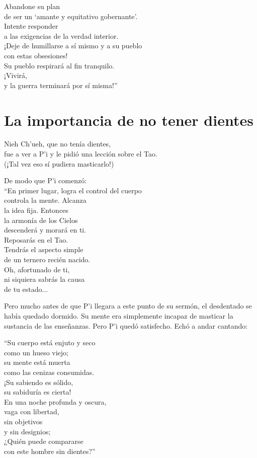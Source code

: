 \documentclass[hidelinks]{memoir}
\begin{document}
	Abandone su plan\\
	de ser un `amante y equitativo gobernante'.\\
	Intente responder\\
	a las exigencias de la verdad interior.\\
	¡Deje de humillarse a sí mismo y a su pueblo\\
	con estas obsesiones!\\
	Su pueblo respirará al fin tranquilo.\\
	¡Vivirá,\\
	y la guerra terminará por sí misma!''
	
	\chapter*{La importancia de no tener dientes}
	
	Nieh Ch'ueh, que no tenía dientes,\\
	fue a ver a P'i y le pidió una lección sobre el Tao.\\
	(¡Tal vez eso sí pudiera masticarlo!)
	
	De modo que P'i comenzó:\\
	``En primer lugar, logra el control del cuerpo\\
	controla la mente. Alcanza\\
	la idea fija. Entonces\\
	la armonía de los Cielos\\
	descenderá y morará en ti.\\
	Reposarás en el Tao.\\
	Tendrás el aspecto simple\\
	de un ternero recién nacido.\\
	Oh, afortunado de ti,\\
	ni siquiera sabrás la causa\\
	de tu estado...
	
	Pero mucho antes de que P'i llegara a este punto de su sermón, el
	desdentado se había quedado dormido. Su mente era simplemente incapaz de
	masticar la sustancia de las enseñanzas. Pero P'i quedó satisfecho. Echó
	a andar cantando:
	
	``Su cuerpo está enjuto y seco\\
	como un hueso viejo;\\
	su mente está muerta\\
	como las cenizas consumidas.\\
	¡Su sabiendo es sólido,\\
	su sabiduría es cierta!\\
	En una noche profunda y oscura,\\
	vaga con libertad,\\
	sin objetivos\\
	y sin designios;\\
	¿Quién puede compararse\\
	con este hombre sin dientes?''
	
\end{document}
